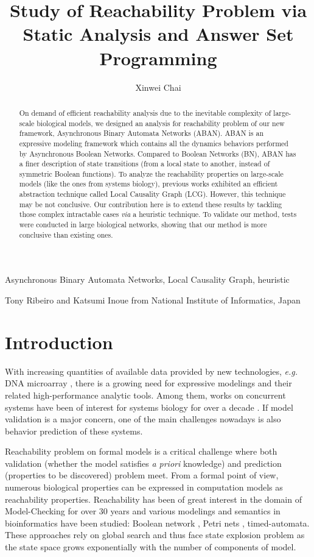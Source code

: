 \documentclass[en]{jdoc}
\title{Study of Reachability Problem via Static Analysis and Answer Set Programming}
\author{Xinwei Chai}
\begin{document}
\makehead

\begin{abstract}
On demand of efficient reachability analysis due to the inevitable complexity of large-scale biological models, we designed an analysis for reachability problem of our new framework, Asynchronous Binary Automata Networks (ABAN).
ABAN is an expressive modeling framework which contains all the dynamics behaviors performed by Asynchronous Boolean Networks. 
Compared to Boolean Networks (BN), ABAN has a finer description of state transitions (from a local state to another, instead of symmetric Boolean functions).
To analyze the reachability properties on large-scale models (like the ones from systems biology), previous works exhibited an efficient abstraction technique called Local Causality Graph (LCG). 
However, this technique may be not conclusive. 
Our contribution here is to extend these results by tackling those complex intractable cases \textit{via} a heuristic technique. 
To validate our method, tests were conducted in large biological networks, showing that our method is more conclusive than existing ones.
\end{abstract}

\begin{keywords}
Asynchronous Binary Automata Networks, Local Causality Graph, heuristic
\end{keywords}

\begin{collaborations}
Tony Ribeiro and Katsumi Inoue from National Institute of Informatics, Japan
\end{collaborations}

\section{Introduction}
With increasing quantities of available data provided by new technologies, \textit{e.g.} DNA microarray \cite{marx2013}, there is a growing need for expressive modelings and their related high-performance analytic tools. 
Among them, works on concurrent systems have been of interest for systems biology for over a decade \cite{bortolussi2008modeling,wiley2003computational}.
If model validation is a major concern, one of the main challenges nowadays is also behavior prediction of these systems. 

Reachability problem on formal models is a critical challenge where both validation (whether the model satisfies \textit{a priori} knowledge) and prediction (properties to be discovered) problem meet.
From a formal point of view, numerous biological properties can be expressed in computation models as reachability properties. 
Reachability has been of great interest in the domain of Model-Checking for over 30 years \cite{clarke20142} and various modelings and semantics in bioinformatics have been studied: Boolean network \cite{akutsu2007control}, Petri nets \cite{mayr1984,esparza1998}, timed-automata\cite{Daws1998,wozna2003}.
These approaches rely on global search and thus face state explosion problem as the state space grows exponentially with the number of components of model.
\end{document}
